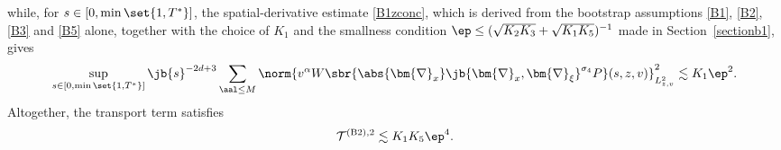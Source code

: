 while, for $s\in[0,\min\set{1,T^*}]$, the spatial-derivative estimate \eqref{B1zconc}, which is derived from the bootstrap assumptions \eqref{B1}, \eqref{B2}, \eqref{B3} and \eqref{B5} alone, together with the choice of $K_1$ and the smallness condition $\ep\leq(\sqrt{K_2K_3}+\sqrt{K_1K_5})^{-1}$ made in Section~\ref{sectionb1}, gives\vspace*{-3pt}
\begin{align*}
\sup_{s\in[0,\min\set{1,T^*}]}\jb{s}^{-2d+3}\sum_{\aal\leq M}\norm{\vphantom{2_2^2}v^\alpha W\sbr{\abs{\bm{\nabla}_x}\jb{\bm{\nabla}_x,\bm{\nabla}_\xi}^{\sigma_4}P}(s,z,v)}_{L^2_{z,v}}^2\lesssim K_1\ep^2.
\end{align*}
Altogether, the transport term satisfies
\begin{align*}
\mathcal {T}^{\mathrm{(B2),2}}\lesssim K_1K_5\ep^4.
\end{align*}

